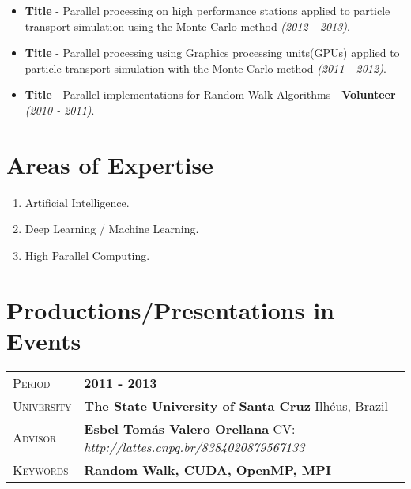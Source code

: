 \documentclass[10pt, a4paper, oneside, final]{scrartcl} %
\newcommand{\gray}{\rowcolor[gray]{.90}} %
\begin{document}
\begin{itemize}\itemsep1.5pt
\item \textbf{Title} - Parallel processing on high performance stations applied to particle transport simulation using the Monte Carlo method \textit{(2012 - 2013)}.

\item \textbf{Title} - Parallel processing using Graphics processing units(GPUs) applied to particle transport simulation with the Monte Carlo method \textit{(2011 - 2012)}.

\item \textbf{Title} - Parallel implementations for Random Walk Algorithms - \textbf{Volunteer} \textit{(2010 - 2011)}.
\end{itemize}


\section{Areas of Expertise}

\begin{enumerate}\itemsep1.5pt
\item Artificial Intelligence.
\item Deep Learning / Machine Learning.
\item High Parallel Computing.
\end{enumerate}


\section{Productions/Presentations in Events}

\begin{center}
\begin{tabularx}{1.0\linewidth}{>{\raggedleft\scshape}p{2.34cm}X}
\gray Period & \textbf{2011 - 2013}\\
\gray University & \textbf{The State University of Santa Cruz} \hfill Ilhéus, Brazil\\
\gray Advisor & \textbf{Esbel Tomás Valero Orellana} \hfill CV: \hyperref[Esbel Valero]{\textit{http://lattes.cnpq.br/8384020879567133}}\\
\gray Keywords & \textbf{Random Walk, CUDA, OpenMP, MPI}
\end{tabularx}
\end{center}
\end{document}
